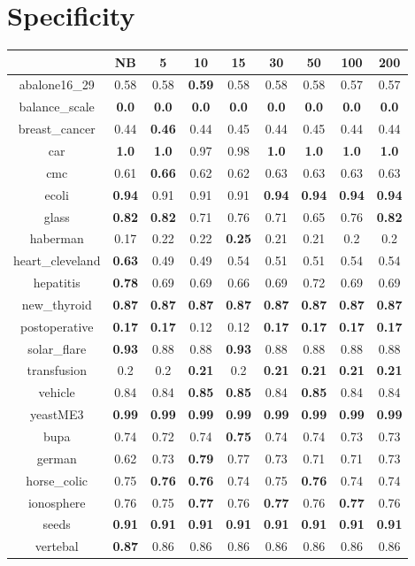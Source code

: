 \documentclass{article}%
\begin{document}
%
\section*{Specificity}%
\begin{tabular}{c|cccccccc}%
\hline%
&NB&5&10&15&30&50&100&200\\%
\hline%
abalone16\_29&0.58&0.58&\textbf{0.59}&0.58&0.58&0.58&0.57&0.57\\%
\hline%
balance\_scale&\textbf{0.0}&\textbf{0.0}&\textbf{0.0}&\textbf{0.0}&\textbf{0.0}&\textbf{0.0}&\textbf{0.0}&\textbf{0.0}\\%
\hline%
breast\_cancer&0.44&\textbf{0.46}&0.44&0.45&0.44&0.45&0.44&0.44\\%
\hline%
car&\textbf{1.0}&\textbf{1.0}&0.97&0.98&\textbf{1.0}&\textbf{1.0}&\textbf{1.0}&\textbf{1.0}\\%
\hline%
cmc&0.61&\textbf{0.66}&0.62&0.62&0.63&0.63&0.63&0.63\\%
\hline%
ecoli&\textbf{0.94}&0.91&0.91&0.91&\textbf{0.94}&\textbf{0.94}&\textbf{0.94}&\textbf{0.94}\\%
\hline%
glass&\textbf{0.82}&\textbf{0.82}&0.71&0.76&0.71&0.65&0.76&\textbf{0.82}\\%
\hline%
haberman&0.17&0.22&0.22&\textbf{0.25}&0.21&0.21&0.2&0.2\\%
\hline%
heart\_cleveland&\textbf{0.63}&0.49&0.49&0.54&0.51&0.51&0.54&0.54\\%
\hline%
hepatitis&\textbf{0.78}&0.69&0.69&0.66&0.69&0.72&0.69&0.69\\%
\hline%
new\_thyroid&\textbf{0.87}&\textbf{0.87}&\textbf{0.87}&\textbf{0.87}&\textbf{0.87}&\textbf{0.87}&\textbf{0.87}&\textbf{0.87}\\%
\hline%
postoperative&\textbf{0.17}&\textbf{0.17}&0.12&0.12&\textbf{0.17}&\textbf{0.17}&\textbf{0.17}&\textbf{0.17}\\%
\hline%
solar\_flare&\textbf{0.93}&0.88&0.88&\textbf{0.93}&0.88&0.88&0.88&0.88\\%
\hline%
transfusion&0.2&0.2&\textbf{0.21}&0.2&\textbf{0.21}&\textbf{0.21}&\textbf{0.21}&\textbf{0.21}\\%
\hline%
vehicle&0.84&0.84&\textbf{0.85}&\textbf{0.85}&0.84&\textbf{0.85}&0.84&0.84\\%
\hline%
yeastME3&\textbf{0.99}&\textbf{0.99}&\textbf{0.99}&\textbf{0.99}&\textbf{0.99}&\textbf{0.99}&\textbf{0.99}&\textbf{0.99}\\%
\hline%
bupa&0.74&0.72&0.74&\textbf{0.75}&0.74&0.74&0.73&0.73\\%
\hline%
german&0.62&0.73&\textbf{0.79}&0.77&0.73&0.71&0.71&0.73\\%
\hline%
horse\_colic&0.75&\textbf{0.76}&\textbf{0.76}&0.74&0.75&\textbf{0.76}&0.74&0.74\\%
\hline%
ionosphere&0.76&0.75&\textbf{0.77}&0.76&\textbf{0.77}&0.76&\textbf{0.77}&0.76\\%
\hline%
seeds&\textbf{0.91}&\textbf{0.91}&\textbf{0.91}&\textbf{0.91}&\textbf{0.91}&\textbf{0.91}&\textbf{0.91}&\textbf{0.91}\\%
\hline%
vertebal&\textbf{0.87}&0.86&0.86&0.86&0.86&0.86&0.86&0.86\\%
\hline%
\end{tabular}
\end{document}
